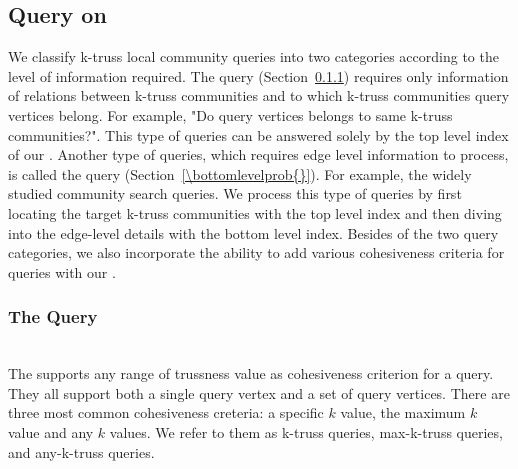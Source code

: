\subsection{Query on \TwoLevelIndex{}}
\label{query}
We classify k-truss local community queries into two categories according to the level of information required. The \toplevelprob{} query (Section~\ref{\toplevelprob{}}) requires only information of relations between k-truss communities and to which k-truss communities query vertices belong. For example, "Do query vertices belongs to same k-truss communities?". This type of queries can be answered solely by the top level index of our \twolevelindex{}. Another type of queries, which requires edge level information to process, is called the \bottomlevelprob{} query (Section~\ref{\bottomlevelprob{}}). For example, the widely studied community search queries. We process this type of queries by first locating the target k-truss communities with the top level index and then diving into the edge-level details with the bottom level index. Besides of the two query categories, we also incorporate the ability to add various cohesiveness criteria for queries with our \twolevelindex{}.

\subsubsection{The \TopLevelProb{} Query}
\label{\toplevelprob{}}

~\\The \twolevelindex{} supports any range of trussness value as cohesiveness criterion for a query. They all support both a single query vertex and a set of query vertices. There are three most common cohesiveness creteria: a specific $k$ value, the maximum $k$ value and any $k$ values. We refer to them as k-truss queries, max-k-truss queries, and any-k-truss queries. 

